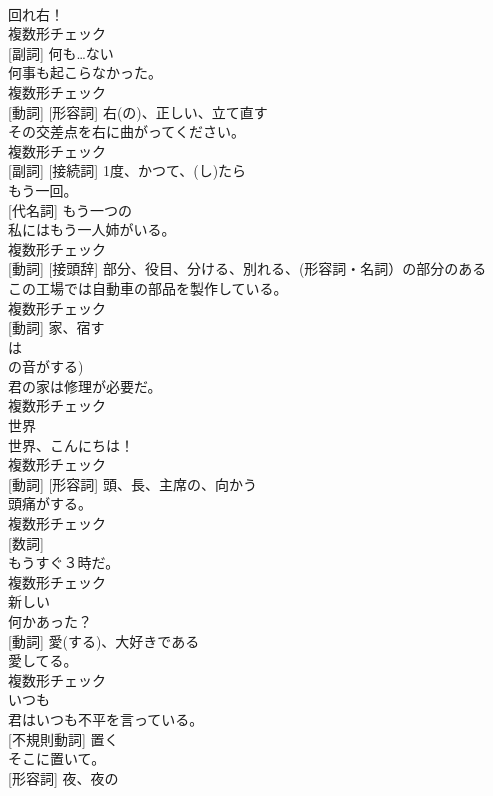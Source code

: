 \documentclass[8pt]{extreport}
\begin{document}
\begin{CJK}{UTF8}{min}
\\	回れ右！	
\\	複数形チェック
\\	[名詞] [副詞]	何も…ない	
\\	何事も起こらなかった。	
\\	複数形チェック
\\	[名詞] [動詞] [形容詞]	右(の)、正しい、立て直す	
\\	その交差点を右に曲がってください。	
\\	複数形チェック
\\	[形容詞] [副詞] [接続詞]	1度、かつて、(し)たら	
\\	もう一回。	
\\	[形容詞] [代名詞]	もう一つの	
\\	私にはもう一人姉がいる。	
\\	複数形チェック
\\	[名詞] [動詞] [接頭辞]	部分、役目、分ける、別れる、(形容詞・名詞）の部分のある	
\\	この工場では自動車の部品を製作している。	
\\	複数形チェック
\\	[名詞] [動詞]	家、宿す
\\	は 
\\	の音がする)	
\\	君の家は修理が必要だ。	
\\	複数形チェック
\\	[名詞]	世界	
\\	世界、こんにちは！	
\\	複数形チェック
\\	[名詞] [動詞] [形容詞]	頭、長、主席の、向かう	
\\	頭痛がする。	
\\	複数形チェック
\\	[名詞] [数詞]	
\\	もうすぐ３時だ。	
\\	複数形チェック
\\	[形容詞]	新しい	
\\	何かあった？	
\\	[名詞] [動詞]	愛(する)、大好きである	
\\	愛してる。	
\\	複数形チェック
\\	[副詞]	いつも	
\\	君はいつも不平を言っている。	
\\	[動詞] [不規則動詞]	置く	
\\	そこに置いて。	
\\	[名詞] [形容詞]	夜、夜の	

\end{CJK}
\end{document}
